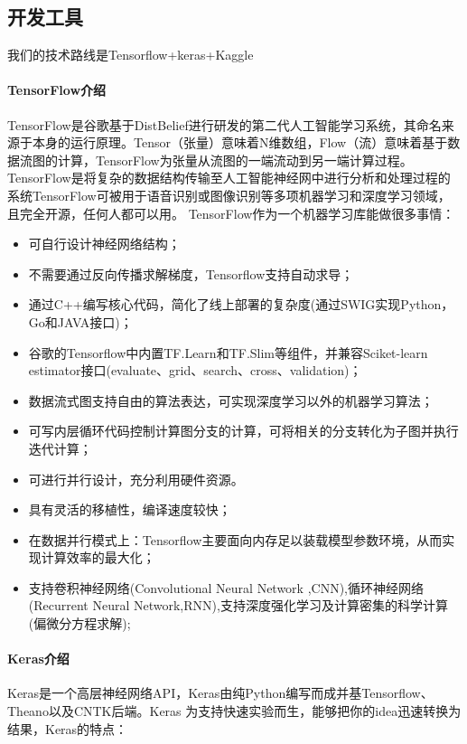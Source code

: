 \subsection{开发工具}
我们的技术路线是Tensorflow+keras+Kaggle
\paragraph{TensorFlow介绍}
TensorFlow是谷歌基于DistBelief进行研发的第二代人工智能学习系统，其命名来源于本身的运行原理。Tensor（张量）意味着N维数组，Flow（流）意味着基于数据流图的计算，TensorFlow为张量从流图的一端流动到另一端计算过程。TensorFlow是将复杂的数据结构传输至人工智能神经网中进行分析和处理过程的系统TensorFlow可被用于语音识别或图像识别等多项机器学习和深度学习领域，且完全开源，任何人都可以用。
TensorFlow作为一个机器学习库能做很多事情：

\begin{itemize}
    \item 可自行设计神经网络结构；
    \item 不需要通过反向传播求解梯度，Tensorflow支持自动求导；
    \item 通过C++编写核心代码，简化了线上部署的复杂度(通过SWIG实现Python，Go和JAVA接口)；
    \item 谷歌的Tensorflow中内置TF.Learn和TF.Slim等组件，并兼容Sciket-learn estimator接口(evaluate、grid、search、cross、validation)；
    \item 数据流式图支持自由的算法表达，可实现深度学习以外的机器学习算法；
    \item 可写内层循环代码控制计算图分支的计算，可将相关的分支转化为子图并执行迭代计算；
    \item 可进行并行设计，充分利用硬件资源。 
    \item 具有灵活的移植性，编译速度较快；
    \item 在数据并行模式上：Tensorflow主要面向内存足以装载模型参数环境，从而实现计算效率的最大化；
    \item 支持卷积神经网络(Convolutional Neural Network ,CNN),循环神经网络(Recurrent Neural Network,RNN),支持深度强化学习及计算密集的科学计算(偏微分方程求解);
\end{itemize}

\paragraph{Keras介绍}
Keras是一个高层神经网络API，Keras由纯Python编写而成并基Tensorflow、Theano以及CNTK后端。Keras 为支持快速实验而生，能够把你的idea迅速转换为结果，Keras的特点：


